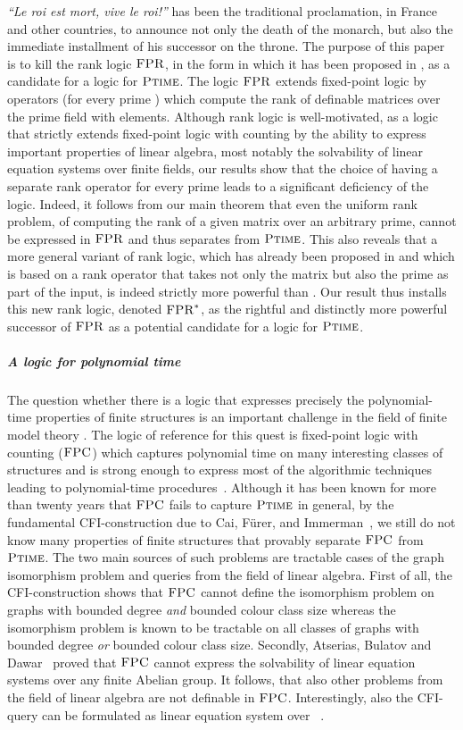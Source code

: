\documentclass[a4paper,UKenglish]{lipics}
\newcommand{\logic}[1]{\ensuremath{\textsc{#1}}\xspace}
\newcommand{\FPC}{\logic{FPC}}
\newcommand{\FPRK}{\logic{FPR}}
\newcommand{\FPR}{\FPRK}
\newcommand{\FPRvar}{\ensuremath{\logic{FPR}^*}\xspace}
\newcommand{\compclass}[1]{\ensuremath{\textsc{#1}}\xspace}
\newcommand{\PTIME}{\compclass{Ptime}}
\theoremstyle{plain}
\begin{document}
\emph{``Le roi est mort, vive le roi!''} has been the traditional proclamation,
in France and other countries,
to announce not only the death of the monarch, but also the
immediate installment of his successor on the throne.
The purpose of this paper is to kill the rank logic \FPR, in the form in which 
it
has been proposed in \cite{DaGrHoLa09},  as a candidate for a logic for \PTIME.
The logic \FPR extends fixed-point logic by operators  (for every
prime ) which compute the rank of definable matrices over the prime
field  with  elements. Although rank logic is well-motivated,
as a logic that strictly extends fixed-point logic with counting
by the ability to express important properties of linear algebra,
most notably the solvability of linear equation systems over finite
fields, our results show that the choice of having a separate rank operator 
for every prime  leads to a significant deficiency of the logic.
Indeed, it follows from our main theorem that 
even the uniform rank problem, of computing the rank of a 
given matrix over an arbitrary prime, cannot be expressed in \FPR
and thus separates  from \PTIME. 
This also reveals that a more general variant of rank logic,
which has already been proposed in \cite{Ho10, La11, Pa10}
and which is based on a rank operator that takes not only the matrix but also
the prime  as part of the input, is indeed strictly
more powerful than . 
Our result thus installs this
new rank logic, denoted \FPRvar, as the rightful 
and distinctly more powerful successor of 
\FPR as a potential candidate for a logic for \PTIME. 

\subparagraph*{A logic for polynomial time}
The question whether there is a logic that expresses precisely the 
polynomial-time properties of finite structures
is an important challenge in the field of finite model theory 
\cite{FMTbook,Gr08}. 
The logic of reference for this quest is
fixed-point logic with counting (\FPC) which
captures polynomial time on many interesting classes
of structures and is strong enough to express most of 
the algorithmic techniques leading to polynomial-time procedures~\cite{Da15}.
Although it has been known for more than twenty years that
\FPC fails to capture \PTIME in general, by the fundamental
CFI-construction due to Cai, Fürer, and Immerman~\cite{CFI92},
we still do not know many properties of finite structures
that provably separate \FPC from \PTIME.
The two main sources of such problems
are tractable cases of the graph isomorphism problem and queries from the field
of linear algebra.
First of all, the CFI-construction shows that \FPC 
cannot define the isomorphism problem on graphs with bounded 
degree \emph{and}  bounded colour class size
whereas the isomorphism problem is known to
be tractable on all classes of graphs  
with bounded degree \emph{or} bounded colour class size. 
Secondly, Atserias, Bulatov and Dawar~\cite{AtBuDa09} proved 
that \FPC cannot express the solvability of linear equation systems over 
any finite Abelian group. 
It follows, that also other problems from the field of linear 
algebra are not definable in \FPC.
Interestingly, also the CFI-query can be formulated
as linear equation system over ~\cite{DaGrHoLa09}.
\end{document}
